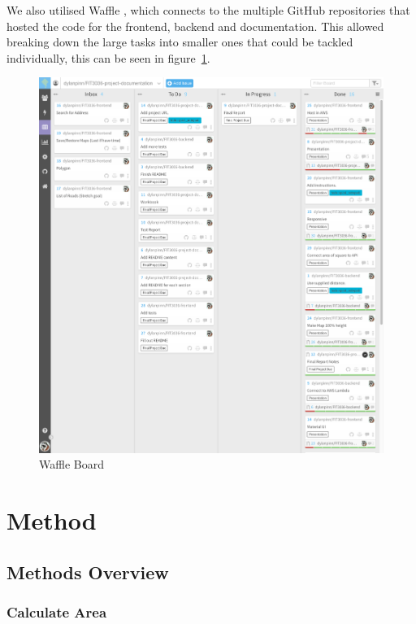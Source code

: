 \documentclass[a4paper,11pt]{article}
\begin{document}
We also utilised Waffle \autocite{waf:20}, which connects to the multiple GitHub
repositories that hosted the code for the frontend, backend and documentation.
This allowed breaking down the large tasks into smaller ones that could be
tackled individually, this can be seen in figure~\ref{fig:waffle}.

\begin{figure}[H]
  \includegraphics[width=\textwidth]{waffle-io}
  \caption{Waffle Board}\label{fig:waffle}
\end{figure}

\section{Method}


\subsection{Methods Overview}

\subsubsection{Calculate Area}
\end{document}
